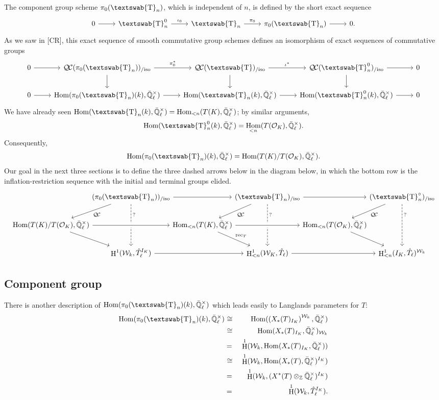 \documentclass{amsart}
\theoremstyle{plain}
\theoremstyle{definition}
\theoremstyle{remark}
\newcommand{\ZZ}{{\mathbb{Z}}}
\newcommand{\EE}{\mathbb{\bar Q}_\ell}
\newcommand{\OK}{\mathcal{O}_K}
\newcommand{\Fq}{k}
\newcommand{\EEx}{\EE^\times}
\newcommand{\Weil}[1]{\mathcal{W}_{#1}}
\newcommand{\mathswab}[1]{\operatorname{\textswab{#1}}}
\newcommand{\GN}[1]{\mathswab{#1}}
\DeclareMathOperator{\Hom}{Hom}
\DeclareMathOperator{\Hh}{H}
\newcommand{\iso}{{\ \cong\ }}
\newcommand{\dual}[1]{{\hat{#1}}}
\newcommand{\QC}{{\mathcal{Q\hskip-0.8pt C}}}
\newcommand{\QCiso}[1]{\QC(#1)_{/\text{iso}}}
\begin{document}
The component group scheme $\pi_0(\GN{T}_n)$, which is independent of $n$, is defined by the short exact sequence
\[
\begin{tikzcd}
0 \arrow{r} & \GN{T}_n^0 \arrow{r}{\iota_0} & \GN{T}_n \arrow{r}{\pi_0} & \pi_0(\GN{T}_n) \arrow{r} & 0.
\end{tikzcd}
\]
As we saw in [CR], this exact sequence of smooth commutative group schemes defines an isomorphism of exact sequences of commutative groups
\[
\begin{tikzcd}
0 \arrow{r} & \QCiso{\pi_0(\GN{T}_n)} \arrow{r}{\pi_0^*} \arrow{d} & \QCiso{\GN{T}} \arrow{r}{\iota^*} \arrow{d} &  \QCiso{\GN{T}_n^0} \arrow{r} \arrow{d} & 0\\
0 \arrow{r} & \Hom(\pi_0(\GN{T}_n)(\Fq),\EEx) \arrow{r} & \Hom(\GN{T}_n(\Fq),\EEx) \arrow{r} & \Hom(\GN{T}_n^0(\Fq),\EEx) \arrow{r} & 0
\end{tikzcd}
\]
We have already seen $\Hom(\GN{T}_n(\Fq),\EEx) = \Hom_{<n}(T(K),\EEx)$;
by similar arguments,
\[
\Hom(\GN{T}^0_n(\Fq),\EEx) = \Hom_{<n}(T(\OK),\EEx).
\]
Consequently,
\[
\Hom(\pi_0(\GN{T}_n)(\Fq),\EEx) = \Hom(T(K)/T(\OK),\EEx).
\]
Our goal in the next three sections is to define the three dashed arrows below in the diagram below, in which the bottom row is the inflation-restriction sequence with the initial and terminal groups elided.
\[
\begin{tikzcd}[column sep=-5, row sep = 20]
&& & \arrow{dl} \QCiso{\pi_0(\GN{T}_n)} \arrow{rr} \arrow[dashed]{dd}[near start]{?} && \arrow{dl}  \QCiso{\GN{T}_n} \arrow[dashed]{dd}[near start]{?} \arrow{rr}  && \arrow{dl}  \QCiso{\GN{T}_n^\circ} \arrow[dashed]{dd}[near start]{?}  &  &  \\
&& \Hom(T(K)/T(\OK),\EEx)  \arrow[crossing over]{rr} \arrow{rd}{} && \Hom_{<n}(T(K),\EEx) \arrow[crossing over]{rr} \arrow{rd}{\text{rec}_T} && \Hom_{<n}(T(\OK),\EEx)  \arrow{rd}{}  &&  & \\
&&  & \Hh^1(\Weil{\Fq},\hat{T}_\ell^{I_K}) \arrow{rr} && \Hh^1_{<n}(\Weil{K},\hat{T}_\ell)\arrow{rr} && \Hh^1_{<n}(I_K,\hat{T}_\ell)^{\Weil{\Fq}} &  &
\end{tikzcd}
\]

\subsection{Component group}

There is another description of $\Hom(\pi_0(\GN{T}_n)(\Fq),\EEx)$ which leads easily to Langlands parameters for $T$:
\begin{eqnarray*}
\Hom(\pi_0(\GN{T}_n)(\Fq),\EEx)
&\iso & \Hom(\left(X_*(T)_{I_K}\right)^{\Weil{\Fq}},\EEx)\\
&\iso& \Hom(X_*(T)_{I_K},\EEx)_{\Weil{\Fq}}\\
&=& \Hh^1(\Weil{\Fq}, \Hom(X_*(T)_{I_K},\EEx)) \\
&\iso& \Hh^1(\Weil{\Fq}, \Hom(X_*(T),\EEx)^{I_K}) \\
&=& \Hh^1(\Weil{\Fq}, (X^*(T)\otimes_{\ZZ} \EEx)^{I_K}) \\
&=& \Hh^1(\Weil{\Fq}, \dual{T}_\ell^{I_K}).
\end{eqnarray*}
\end{document}
